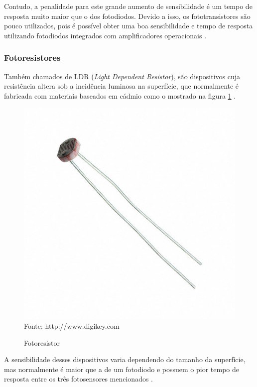Contudo, a penalidade para este grande aumento de sensibilidade é um tempo de resposta muito maior que o dos
fotodiodos. Devido a isso, os fototransistores são pouco utilizados, pois é possível obter uma boa
sensibilidade e tempo de resposta utilizando fotodiodos integrados com amplificadores operacionais
\cite{sinclair2001}.

\subsubsection{Fotoresistores}
Também chamados de LDR (\textit{Light Dependent Resistor}), são dispositivos cuja resistência altera sob a
incidência luminosa na superfície, que normalmente é fabricada com materiais baseados em cádmio como o
mostrado na figura \ref{figura:photoresistor}
\cite{dado_fischer2007}.

\begin{figure}[h]
	\caption{Fotoresistor}
	\centering
	\includegraphics[scale=0.2]{../images/photoresistor.jpg}
	\hspace{\linewidth}
	Fonte: http://www.digikey.com
	\label{figura:photoresistor}
\end{figure}

A sensibilidade desses dispositivos varia dependendo do tamanho da superfície, mas normalmente é maior que a
de um fotodiodo e possuem o pior tempo de resposta entre os três fotosensores mencionados
\cite{thomazini_albuquerque2005}.

